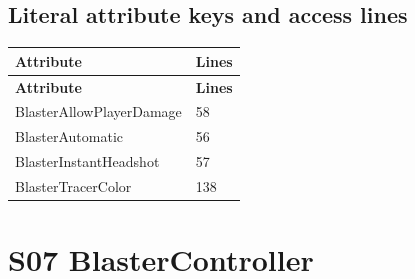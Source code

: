 \subsection{Literal attribute keys and access lines}
\begin{longtable}{p{}p{}}
\toprule
\textbf{Attribute} & \textbf{Lines} \\ \midrule
\endfirsthead
\textbf{Attribute} & \textbf{Lines} \\ \midrule
\endhead
BlasterAllowPlayerDamage & 58 \\
BlasterAutomatic & 56 \\
BlasterInstantHeadshot & 57 \\
BlasterTracerColor & 138 \\
\bottomrule
\end{longtable}
\section{S07 BlasterController}
